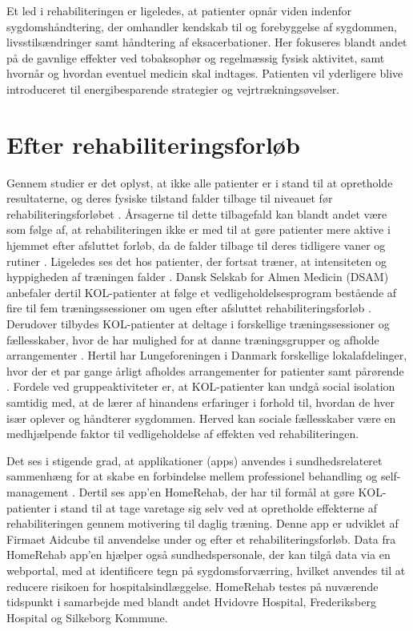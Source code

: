 Et led i rehabiliteringen er ligeledes, at patienter opnår viden indenfor sygdomshåndtering, der omhandler kendskab til og forebyggelse af sygdommen, livsstilsændringer samt håndtering af eksacerbationer. Her fokuseres blandt andet på de gavnlige effekter ved tobaksophør og regelmæssig fysisk aktivitet, samt hvornår og hvordan eventuel medicin skal indtages. Patienten vil yderligere blive introduceret til energibesparende strategier og vejrtrækningsøvelser.\cite{McCarthy2015,Sundhedsstyrelsen2015}    

\section{Efter rehabiliteringsforløb}
Gennem studier er det oplyst, at ikke alle patienter er i stand til at opretholde resultaterne, og deres fysiske tilstand falder tilbage til niveauet før rehabiliteringsforløbet \cite{Egan2012,Beachamp2013,Zanaboni2017,Ringbaek2008}. 
Årsagerne til dette tilbagefald kan blandt andet være som følge af, at rehabiliteringen ikke er med til at gøre patienter mere aktive i hjemmet efter afsluttet forløb, da de falder tilbage til deres tidligere vaner og rutiner \cite{Egan2012}. Ligeledes ses det hos patienter, der fortsat træner, at intensiteten og hyppigheden af træningen falder \cite{Ringbaek2008}. 
Dansk Selskab for Almen Medicin (DSAM) anbefaler dertil KOL-patienter
at følge et vedligeholdelsesprogram bestående af fire til fem træningssessioner om ugen
efter afsluttet rehabiliteringsforløb \cite{dsam2016}. Derudover tilbydes KOL-patienter at deltage i forskellige træningssessioner og fællesskaber, hvor de har mulighed for at danne træningsgrupper og afholde arrangementer \cite{Sundhedsstyrelsen2015}. Hertil har Lungeforeningen i Danmark forskellige lokalafdelinger, hvor der et par gange årligt afholdes arrangementer for patienter samt pårørende \cite{Lungeforeningen2016}.
Fordele ved gruppeaktiviteter er, at KOL-patienter kan undgå social isolation samtidig med, at de lærer af hinandens erfaringer i forhold til, hvordan de hver især oplever og håndterer sygdommen. Herved kan sociale fællesskaber være en medhjælpende faktor til vedligeholdelse af effekten ved rehabiliteringen.\cite{dsam2016}

Det ses i stigende grad, at applikationer (apps) anvendes i sundhedsrelateret sammenhæng for at skabe en forbindelse mellem professionel behandling og self-management \cite{Williams2014}. Dertil ses app'en HomeRehab, der har til formål at gøre KOL-patienter i stand til at tage varetage sig selv ved at opretholde effekterne af rehabiliteringen gennem motivering til daglig træning. Denne app er udviklet af Firmaet Aidcube til anvendelse under og efter et rehabiliteringsforløb. Data fra HomeRehab app'en hjælper også sundhedspersonale, der kan tilgå data via en webportal, med at identificere tegn på sygdomsforværring, hvilket anvendes til at reducere risikoen for hospitalsindlæggelse. HomeRehab testes på nuværende tidspunkt i samarbejde med blandt andet Hvidovre Hospital, Frederiksberg Hospital og Silkeborg Kommune.\cite{HealthcareDenmark2017} 

